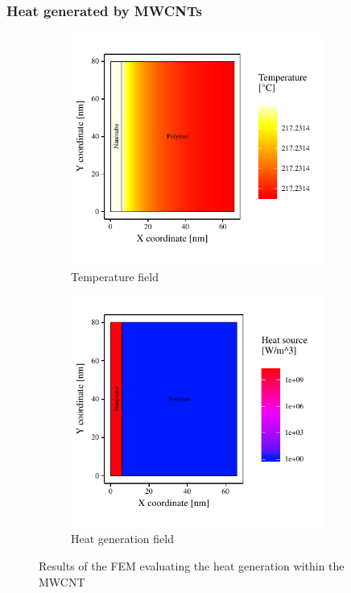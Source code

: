 \documentclass[11pt,review,times]{elsarticle}
\begin{document}
\subsubsection{Heat generated by MWCNTs}
	\label{subsection:mechanism1}

\begin{figure}[htb]
	\centering
	\captionsetup{width=125mm}
	\begin{subfigure}{60mm}
		\centering
		\captionsetup{width=75mm}
		\includegraphics[width=3.25in]{resultats_comsol_axisymetrique_temp}
		\caption{Temperature field}
		\label{fig:temp_axysymmetric}
	\end{subfigure}
	\begin{subfigure}{80mm}
		\centering
		\captionsetup{width=75mm}
		\includegraphics[width=3.25in]{resultats_comsol_axisymetrique_puissance}
		\caption{Heat generation field}
		\label{fig:heat_axysymmetric}
	\end{subfigure}%
	\caption{Results of the FEM evaluating the heat generation within the MWCNT}
	\label{fig:results_axysymmetric}
\end{figure}
\end{document}
